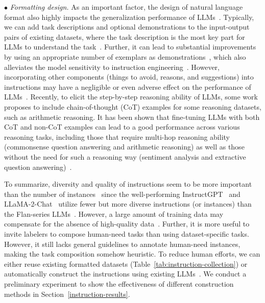 $\bullet$ \emph{Formatting design.}
As an important factor, the design of natural language format also highly impacts the generalization performance of LLMs~\cite{Wang-EMNLP-2022-Super}.
Typically, we can add task descriptions and optional demonstrations to the input-output pairs of existing datasets, where the task description is the most key part for LLMs to understand the task~\cite{Wang-EMNLP-2022-Super}. 
Further, it can lead to substantial improvements by using an appropriate number of exemplars as demonstrations~\cite{Chung-arxiv-2022-Scaling}, which also alleviates the model sensitivity to instruction engineering~\cite{Wei-ICLR-2022-Finetuned,Chung-arxiv-2022-Scaling}. 
However, incorporating other components (\eg things to avoid, reasons, and suggestions) into instructions may have a negligible or even adverse effect on the performance of LLMs~\cite{Mishra-ACL-2022-Cross, Wang-EMNLP-2022-Super}. 
Recently, to elicit the step-by-step reasoning ability of LLMs, some work~\cite{Chung-arxiv-2022-Scaling}  proposes to include chain-of-thought (CoT) examples for some reasoning datasets, such as arithmetic reasoning.
It has been shown that fine-tuning LLMs with both CoT and non-CoT examples can lead to a good performance across various reasoning tasks,  including those that require multi-hop reasoning ability (\eg commonsense question answering and arithmetic reasoning) as well as those without the need for such a reasoning  way (\eg sentiment analysis and  extractive question answering)~\cite{Chung-arxiv-2022-Scaling,Iyer-arxiv-2022-OPT}.


To summarize, diversity and quality of instructions seem to be more important than the number of instances~\cite{zhou-arxiv-2023-lima} since the well-performing  InstructGPT~\cite{Ouyang-arxiv-2022-Training} and LLaMA-2-Chat~\cite{Touvron-2023-llama2-arxiv} utilize fewer but more diverse instructions (or instances) than the Flan-series LLMs~\cite{Wei-ICLR-2022-Finetuned,Chung-arxiv-2022-Scaling}. However, a large amount of training data may compensate for the absence of high-quality data~\cite{Mukherjee-arxiv-2023-Orca}.
Further, it is more useful to invite labelers to compose human-need tasks than using  dataset-specific tasks. However, it still lacks general guidelines to  annotate human-need instances, making the task composition somehow heuristic. 
To reduce human efforts, we can either reuse existing formatted datasets (Table~\ref{tab:instruction-collection}) or automatically construct the instructions using existing LLMs~\cite{Wang-arXiv-2022-Self}. We conduct a preliminary experiment to show the effectiveness of different construction methods in Section~\ref{instruction-results}.


